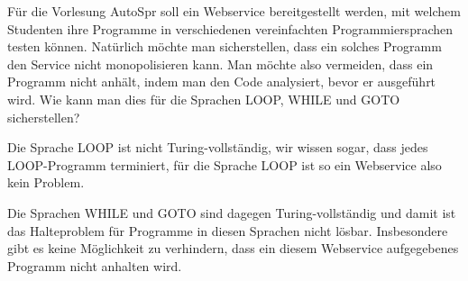 Für die Vorlesung AutoSpr soll ein Webservice bereitgestellt werden, mit
welchem Studenten ihre Programme in verschiedenen vereinfachten
Programmiersprachen testen können.
Natürlich möchte man sicherstellen, dass ein solches Programm den 
Service nicht monopolisieren kann.
Man möchte also vermeiden, dass ein Programm nicht anhält,
indem man den Code analysiert, bevor er ausgeführt wird.
Wie kann man dies für die Sprachen LOOP, WHILE und GOTO sicherstellen?

\begin{loesung}
Die Sprache LOOP ist nicht Turing-vollständig, wir wissen sogar,
dass jedes LOOP-Pro\-gramm terminiert, für die Sprache LOOP ist so ein
Webservice also kein Problem.

Die Sprachen WHILE und GOTO sind dagegen Turing-vollständig und damit
ist das Halteproblem für Programme in diesen Sprachen nicht lösbar.
Insbesondere gibt es keine Möglichkeit zu verhindern, dass ein diesem
Webservice aufgegebenes Programm nicht anhalten wird.
\end{loesung}




